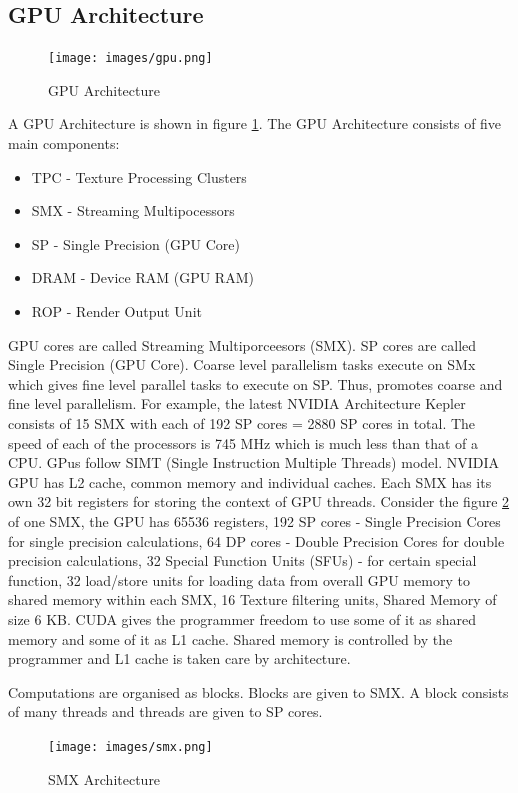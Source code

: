 \documentclass[12pt]{article}
\begin{document}
\subsection{GPU Architecture}
\begin{figure}[H]
    \centering
    \texttt{[image: images/gpu.png]}
    \caption{GPU Architecture}
    \label{fig:gpu}
\end{figure}
A GPU Architecture is shown in figure \ref{fig:gpu}.
The GPU Architecture consists of five main components:
\begin{itemize}
    \item TPC - Texture Processing Clusters
    \item SMX - Streaming Multipocessors
    \item SP - Single Precision (GPU Core)
    \item DRAM - Device RAM (GPU RAM)
    \item ROP - Render Output Unit
\end{itemize}
GPU cores are called Streaming Multiporceesors (SMX).
SP cores are called Single Precision (GPU Core).
Coarse level parallelism tasks execute on SMx which gives fine level parallel tasks to execute on SP.
Thus, promotes coarse and fine level parallelism. For example, the latest NVIDIA Architecture 
Kepler consists of 15 SMX with each of 192 SP cores = 2880 SP cores in total.
The speed of each of the processors is 745 MHz which is much less than that of a CPU.
GPus follow SIMT (Single Instruction Multiple Threads) model.
NVIDIA GPU has L2 cache, common memory and individual caches. Each SMX has its own 32 bit registers
for storing the context of GPU threads. 
Consider the figure \ref{fig:smx} of one SMX, 
the GPU has 65536 registers, 192 SP cores - Single Precision Cores for single precision calculations,
64 DP cores - Double Precision Cores for double precision calculations, 32 Special Function Units (SFUs) -
for certain special function, 32 load/store units for loading data from overall GPU memory to shared memory within 
each SMX, 16 Texture filtering units, Shared Memory of size 6 KB. CUDA gives the programmer freedom to use some of it as shared memory
and some of it as L1 cache. Shared memory is controlled by the programmer and L1 cache is taken care by architecture.

Computations are organised as blocks. Blocks are given to SMX. A block consists of many threads and threads are given to SP cores.
\begin{figure}[H]
    \centering
    \texttt{[image: images/smx.png]}
    \caption{SMX Architecture}
    \label{fig:smx}
\end{figure}
\end{document}
